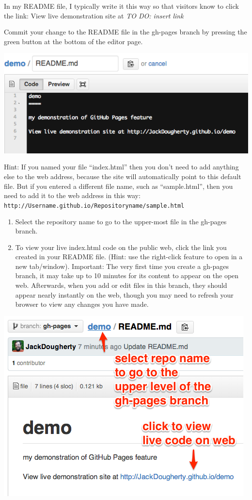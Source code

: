 \documentclass[
  english,
]{book}
\begin{document}
In my README file, I typically write it this way so that visitors know to click the link:
View live demonstration site at \emph{TO DO: insert link }

Commit your change to the README file in the gh-pages branch by pressing the green button at the bottom of the editor page.

\includegraphics{images/08-github/GitHub-EditReadMe.png}

Hint: If you named your file ``index.html'' then you don't need to add anything else to the web address, because the site will automatically point to this default file. But if you entered a different file name, such as ``sample.html'', then you need to add it to the web address in this way: \texttt{http://Username.github.io/Repositoryname/sample.html}

\begin{enumerate}
\def\labelenumi{\arabic{enumi})}
\setcounter{enumi}{8}
\item
  Select the repository name to go to the upper-most file in the gh-pages branch.
\item
  To view your live index.html code on the public web, click the link you created in your README file. (Hint: use the right-click feature to open in a new tab/window). Important: The very first time you create a gh-pages branch, it may take up to 10 minutes for its content to appear on the open web. Afterwards, when you add or edit files in this branch, they should appear nearly instantly on the web, though you may need to refresh your browser to view any changes you have made.
\end{enumerate}

\includegraphics{images/08-github/GitHub-SelectRepoName2.png}
\end{document}
